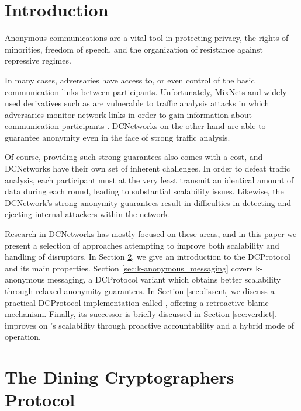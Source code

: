 \section{Introduction}

Anonymous communications are a vital tool in protecting privacy, the rights of minorities,
freedom of speech, and the organization of resistance against repressive regimes.

In many cases, adversaries have access to, or even control of the basic communication
links between participants. Unfortunately, \acp{MixNet} \cite{journals/cacm/Chaum81} and 
widely used derivatives such as \Tor \cite{conf/uss/DingledineMS04} are vulnerable to traffic
analysis attacks in which adversaries monitor network links in order to gain information
about communication participants \cite{murdoch2005low}. \acp{DCNetwork} on the other hand
are able to guarantee anonymity even in the face of strong traffic analysis.

Of course, providing such strong guarantees also comes with a cost, and \acp{DCNetwork}
have their own set of inherent challenges. In order to defeat traffic analysis,
each participant must at the very least transmit an identical amount of data during each round,
leading to substantial scalability issues. Likewise, the \ac{DCNetwork}'s strong anonymity guarantees result
in difficulties in detecting and ejecting internal attackers within the network.

Research in \acp{DCNetwork} has mostly focused on these areas, and in this paper we
present a selection of approaches attempting to improve both scalability and handling of disruptors.
In Section \ref{sec:dining_cryptographers_protocol}, we give an introduction
to the \ac{DCProtocol} and its main properties. Section \ref{sec:k-anonymous_messaging} 
covers k-anonymous messaging, a \ac{DCProtocol} variant which obtains better scalability
through relaxed anonymity guarantees. In Section \ref{sec:dissent} we discuss a practical
\ac{DCProtocol} implementation called \Dissent, offering a retroactive blame mechanism.
Finally, its successor \Verdict is briefly discussed in Section \ref{sec:verdict}. \Verdict
improves on \Dissent's scalability through proactive accountability and a hybrid mode of operation.

\section{The Dining Cryptographers Protocol} \label{sec:dining_cryptographers_protocol}

